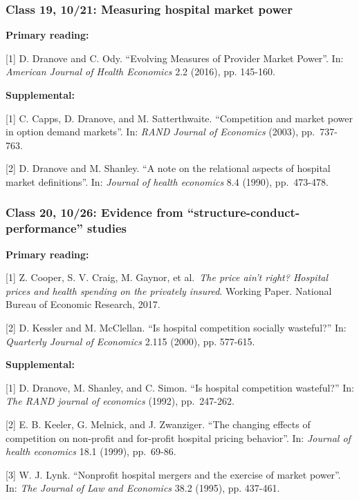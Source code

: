 \documentclass[11pt,]{article}
\begin{document}
\hypertarget{class-19-1021-measuring-hospital-market-power}{%
\subsubsection{Class 19, 10/21: Measuring hospital market
power}\label{class-19-1021-measuring-hospital-market-power}}

\textbf{Primary reading:}

{[}1{]} D. Dranove and C. Ody. ``Evolving Measures of Provider Market
Power''. In: \emph{American Journal of Health Economics} 2.2 (2016), pp.
145-160.

\textbf{Supplemental:}

{[}1{]} C. Capps, D. Dranove, and M. Satterthwaite. ``Competition and
market power in option demand markets''. In: \emph{RAND Journal of
Economics} (2003), pp.~737-763.

{[}2{]} D. Dranove and M. Shanley. ``A note on the relational aspects of
hospital market definitions''. In: \emph{Journal of health economics}
8.4 (1990), pp.~473-478.

\hypertarget{class-20-1026-evidence-from-structure-conduct-performance-studies}{%
\subsubsection{Class 20, 10/26: Evidence from
``structure-conduct-performance''
studies}\label{class-20-1026-evidence-from-structure-conduct-performance-studies}}

\textbf{Primary reading:}

{[}1{]} Z. Cooper, S. V. Craig, M. Gaynor, et al.~\emph{The price ain't
right? Hospital prices and health spending on the privately insured}.
Working Paper. National Bureau of Economic Research, 2017.

{[}2{]} D. Kessler and M. McClellan. ``Is hospital competition socially
wasteful?'' In: \emph{Quarterly Journal of Economics} 2.115 (2000), pp.
577-615.

\textbf{Supplemental:}

{[}1{]} D. Dranove, M. Shanley, and C. Simon. ``Is hospital competition
wasteful?'' In: \emph{The RAND journal of economics} (1992),
pp.~247-262.

{[}2{]} E. B. Keeler, G. Melnick, and J. Zwanziger. ``The changing
effects of competition on non-profit and for-profit hospital pricing
behavior''. In: \emph{Journal of health economics} 18.1 (1999),
pp.~69-86.

{[}3{]} W. J. Lynk. ``Nonprofit hospital mergers and the exercise of
market power''. In: \emph{The Journal of Law and Economics} 38.2 (1995),
pp. 437-461.
\end{document}

